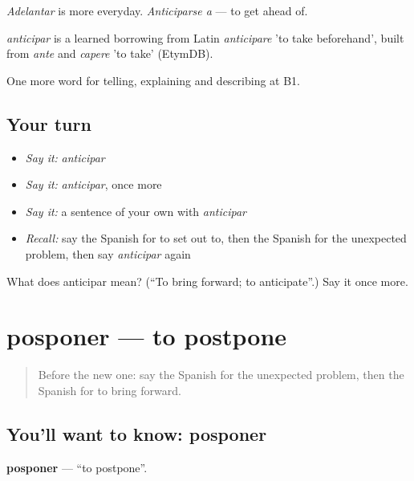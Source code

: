 \emph{Adelantar} is more everyday. \emph{Anticiparse a} — to get ahead of.

\begin{cousinweb}
\emph{anticipar} is a learned borrowing from Latin \emph{anticipare} 'to take beforehand', built from \emph{ante} and \emph{capere} 'to take' (EtymDB).
\end{cousinweb}

\begin{grammarlens}[title={What you've built}]
One more word for telling, explaining and describing at B1.
\end{grammarlens}

\subsection*{Your turn}
\begin{itemize}
\raggedright
  \item \emph{Say it:} \emph{anticipar}
  \item \emph{Say it:} \emph{anticipar}, once more
  \item \emph{Say it:} a sentence of your own with \emph{anticipar}
  \item \emph{Recall:} say the Spanish for to set out to, then the Spanish for the unexpected problem, then say \emph{anticipar} again
\end{itemize}

\begin{tcolorbox}[breakable,colback=teal!4,colframe=teal!35!black,title={Before you move on}]
What does anticipar mean? (\textquotedblleft{}To bring forward; to anticipate\textquotedblright{}.) Say it once more.
\end{tcolorbox}
\section[posponer]{posponer — to postpone}

\label{lesson:ES-C616-posponer}



\begin{quote}
Before the new one: say the Spanish for the unexpected problem, then the Spanish for to bring forward.
\end{quote}

\subsection*{You'll want to know: posponer}
\textbf{posponer} — \textquotedblleft{}to postpone\textquotedblright{}.

